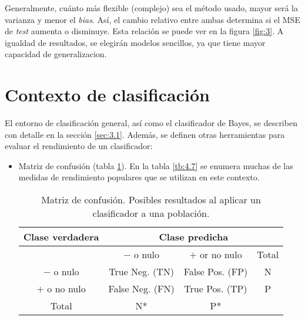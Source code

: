 Generalmente, cuánto más flexible (complejo) sea el método usado, mayor será la varianza y menor el \textit{bias}. Así, el cambio relativo entre ambas determina si el MSE de \textit{test} aumenta o disminuye. Esta relación se puede ver en la figura \ref{fig:3}. A igualdad de resultados, se elegirán modelos sencillos, ya que tiene mayor capacidad de generalizacion. 

\section{Contexto de clasificación}

El entorno de clasificación general, así como el clasificador de Bayes, se describen con detalle en la sección \ref{sec:3.1}. Además, se definen otras herramientas para evaluar el rendimiento de un clasificador:
\begin{itemize}
\item Matriz de confusión (tabla \ref{tb:4.6}). En la tabla \ref{tb:4.7} se enumera muchas de las medidas de rendimiento populares que se utilizan en este contexto. 
\begin{table}[h]
\centering
\begin{tabular}{c|c|c|c}
\hline
Clase verdadera & \multicolumn{3}{c}{Clase predicha} \\ \hline
& $-$ o nulo & $+$ or no nulo & Total \\ \hline
$-$ o nulo & True Neg. (TN) & False Pos. (FP) & N \\ \hline
$+$ o no nulo & False Neg. (FN) & True Pos. (TP) & P \\ \hline
Total & N* & P* &  \\ \hline
\end{tabular}
\caption{Matriz de confusión. Posibles resultados al aplicar un clasificador a una población.}
\label{tb:4.6}
\end{table}
\begin{table}[h]
\centering
{}
\end{table}
\end{itemize}
